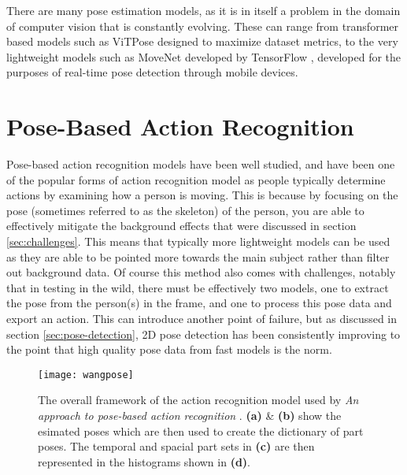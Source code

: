 There are many pose estimation models, as it is in itself a problem in the domain of computer vision that is constantly evolving. These can range from transformer based models such as ViTPose \cite{vitpose} designed to maximize dataset metrics, to the very lightweight models such as MoveNet developed by TensorFlow \cite{tensorflow2015-whitepaper}, developed for the purposes of real-time pose detection through mobile devices.

\section{Pose-Based Action Recognition}
\label{sec:pose-based}

Pose-based action recognition models have been well studied, and have been one of the popular forms of action recognition model as people typically determine actions by examining how a person is moving. This is because by focusing on the pose (sometimes referred to as the skeleton) of the person, you are able to effectively mitigate the background effects that were discussed in section \ref{sec:challenges}. This means that typically more lightweight models can be used as they are able to be pointed more towards the main subject rather than filter out background data. Of course this method also comes with challenges, notably that in testing in the wild, there must be effectively two models, one to extract the pose from the person(s) in the frame, and one to process this pose data and export an action. This can introduce another point of failure, but as discussed in section \ref{sec:pose-detection}, 2D pose detection has been consistently improving to the point that high quality pose data from fast models is the norm.

\begin{figure}[h]
	\texttt{[image: wangpose]}
	\centering
	\caption{The overall framework of the action recognition model used by \textit{An approach to pose-based action recognition} \cite{WangPose}. \textbf{(a)} \& \textbf{(b)} show the esimated poses which are then used to create the dictionary of part poses. The temporal and spacial part sets in \textbf{(c)} are then represented in the histograms shown in \textbf{(d)}.}
	\label{fig:wangpose}
\end{figure}

